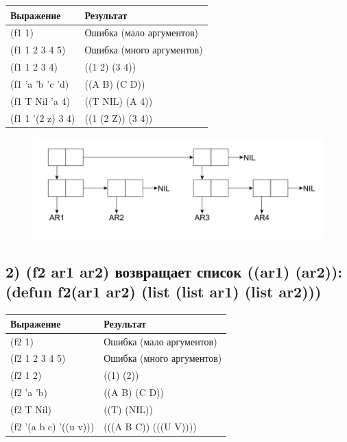\documentclass[a4paper,12pt]{article}
\begin{document}
	\begin{table} [h!]
		\begin{center}
			\begin{tabular}{|l|l|}
				\hline
				{\bf  Выражение} &    {\bf Результат} \\
				\hline
				{ (f1 1)}& Ошибка (мало аргументов)\\
				\hline
				{(f1 1 2 3 4 5)}& Ошибка (много аргументов)\\
				\hline
				{(f1 1 2 3 4)}& ((1 2) (3 4))\\
				\hline
				{(f1 'a 'b 'c 'd)}& ((A B) (C D))\\
				\hline
				{(f1 T Nil 'a 4)}& ((T NIL) (A 4))\\
				\hline
				{(f1 1 '(2 z) 3 4)}& ((1 (2 Z)) (3 4))\\
				\hline
			\end{tabular}  
			\label{m3}
		\end{center}
	\end{table}

	\begin{figure}[h!]
		\begin{center}
			{\includegraphics[scale = 0.4]{first.jpg}}
			\label{first}
		\end{center}
	\end{figure}
	
	\subsection*{ 2) (f2 ar1 ar2) возвращает список ((ar1) (ar2)): (defun f2(ar1 ar2) (list (list ar1) (list ar2)))}
	
	\begin{table} [h!]
		\begin{center}
			\begin{tabular}{|l|l|}
				\hline
				{\bf  Выражение} &    {\bf Результат} \\
				\hline
				{ (f2 1)}& Ошибка (мало аргументов)\\
				\hline
				{(f2 1 2 3 4 5)}& Ошибка (много аргументов)\\
				\hline
				{(f2 1 2)}& ((1) (2))\\
				\hline
				{(f2 'a 'b)}& ((A B) (C D))\\
				\hline
				{(f2 T Nil)}& ((T) (NIL))\\
				\hline
				{(f2 '(a b c) '((u v)))}& (((A B C)) (((U V))))\\
				\hline
			\end{tabular}  
			\label{m4}
		\end{center}
	\end{table}
\end{document}
